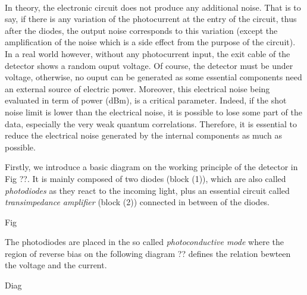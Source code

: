 \documentclass[12pt]{report}
\begin{document}
\paragraph{}

In theory, the electronic circuit does not produce any additional noise. That is to say, if there is any variation of the photocurrent at the entry of the circuit, thus after the diodes, the output noise corresponds to this variation (except the amplification of the noise which is a side effect from the purpose of the circuit). In a real world however, without any photocurrent input, the exit cable of the detector shows a random ouput voltage. Of course, the detector must be under voltage, otherwise, no ouput can be generated as some essential components need an external source of electric power. Moreover, this electrical noise being evaluated in term of power (dBm), is a critical parameter. Indeed, if the shot noise limit is lower than the electrical noise, it is possible to lose some part of the data, especially the very weak quantum correlations. Therefore, it is essential to reduce the electrical noise generated by the internal components as much as possible.

Firstly, we introduce a basic diagram on the working principle of the detector in Fig ??. It is mainly composed of two diodes (block (1)), which are also called \textit{photodiodes} as they react to the incoming light, plus an essential circuit called \textit{transimpedance amplifier} (block (2)) connected in between of the diodes.

Fig

The photodiodes are placed in the so called \textit{photoconductive mode} where the region of reverse bias on the following diagram ?? defines the relation bewteen the voltage and the current. 

Diag
\end{document}
